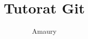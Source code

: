 \documentclass[a4paper,10pt]{article}
\title{Tutorat Git}
\author{Amaury \textesc{Louarn}}
\begin{document}
\newpage

\section{}
\end{document}
